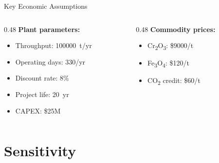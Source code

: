 \documentclass[aspectratio=169]{beamer}
\begin{document}
\begin{frame}{Key Economic Assumptions}
\begin{columns}[T]
\begin{column}{0.48\textwidth}
\textbf{Plant parameters:}
\begin{itemize}
\item Throughput: \num{100000}~t/yr
\item Operating days: 330/yr
\item Discount rate: 8\%
\item Project life: 20~yr
\item CAPEX: \$25M
\end{itemize}
\end{column}
\begin{column}{0.48\textwidth}
\textbf{Commodity prices:}
\begin{itemize}
\item Cr\textsubscript{2}O\textsubscript{3}: \$\num{9000}/t
\item Fe\textsubscript{3}O\textsubscript{4}: \$120/t
\item CO\textsubscript{2} credit: \$60/t
\end{itemize}
\end{column}
\end{columns}
\end{frame}

\section{Sensitivity}
\end{document}
